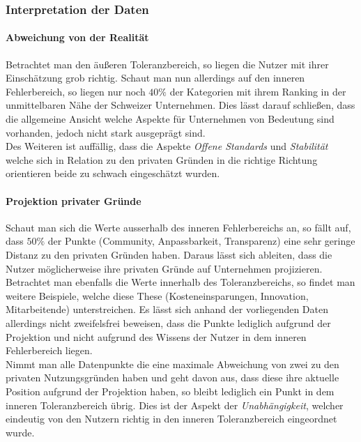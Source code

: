 \documentclass[a4paper]{article}
\begin{document}
            \subsubsection{Interpretation der Daten}
                \paragraph{Abweichung von der Realität}
                    Betrachtet man den äußeren Toleranzbereich, so liegen die Nutzer mit ihrer Einschätzung grob richtig. Schaut man nun allerdings auf den inneren Fehlerbereich, so liegen nur noch $40\%$ der Kategorien mit ihrem Ranking in der unmittelbaren Nähe der Schweizer Unternehmen. Dies lässt darauf schließen, dass die allgemeine Ansicht welche Aspekte für Unternehmen von Bedeutung sind vorhanden, jedoch nicht stark ausgeprägt sind.\\
                    Des Weiteren ist auffällig, dass die Aspekte \emph{Offene Standards} und \emph{Stabilität} welche sich in Relation zu den privaten Gründen in die richtige Richtung orientieren beide zu schwach eingeschätzt wurden.
                    
                \paragraph{Projektion privater Gründe}
                    Schaut man sich die Werte ausserhalb des inneren Fehlerbereichs an, so fällt auf, dass $50\%$ der Punkte ({\scriptsize Community, Anpassbarkeit, Transparenz}) eine sehr geringe Distanz zu den privaten Gründen haben. Daraus lässt sich ableiten, dass die Nutzer möglicherweise ihre privaten Gründe auf Unternehmen projizieren.\\
                    Betrachtet man ebenfalls die Werte innerhalb des Toleranzbereichs, so findet man weitere Beispiele, welche diese These ({\scriptsize Kosteneinsparungen, Innovation, Mitarbeitende}) unterstreichen. Es lässt sich anhand der vorliegenden Daten allerdings nicht zweifelsfrei beweisen, dass die Punkte lediglich aufgrund der Projektion und nicht aufgrund des Wissens der Nutzer in dem inneren Fehlerbereich liegen.\\
                    Nimmt man alle Datenpunkte die eine maximale Abweichung von zwei zu den privaten Nutzungsgründen haben und geht davon aus, dass diese ihre aktuelle Position aufgrund der Projektion haben, so bleibt lediglich ein Punkt in dem inneren Toleranzbereich übrig. Dies ist der Aspekt der \emph{Unabhängigkeit}, welcher eindeutig von den Nutzern richtig in den inneren Toleranzbereich eingeordnet wurde.
    
\end{document}

